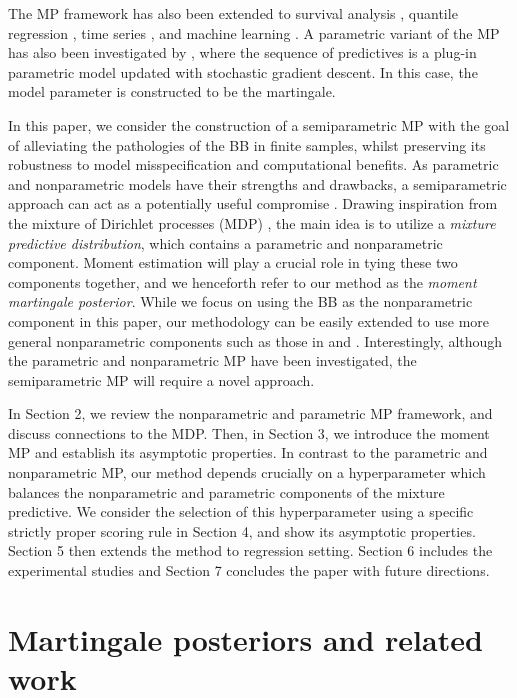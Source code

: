 \documentclass[11pt,a4paper]{article}
\theoremstyle{plain}
\theoremstyle{remark}
\theoremstyle{remark}
\begin{document}
 The MP framework has also been extended to survival analysis \citep{walker2024martingale}, quantile regression \citep{fong2024Bayesian}, time series \citep{Moya2024}, and machine learning \citep{lee2023martingale,falck2024large}.
 A parametric variant of the MP has also been investigated by \citep{holmes2023statistical,garelli2024asymptotics, fortini2025exchangeability}, where the sequence of predictives is a plug-in parametric model updated with stochastic gradient descent. In this case, the model parameter is constructed to be the martingale. 

In this paper, we consider the construction of a semiparametric MP with the goal of alleviating the pathologies of the BB in finite samples, whilst preserving its robustness to model misspecification and computational benefits. As parametric and nonparametric models have their strengths and drawbacks, a semiparametric approach can act as a potentially useful compromise \citep{powell1994estimation}. Drawing inspiration from the mixture of Dirichlet processes (MDP) \citep{Antoniak1974,Lyddon2018}, the main idea is to utilize a \textit{mixture predictive distribution}, which contains a parametric and nonparametric component.  Moment estimation will play a crucial role in tying these two components together, and we henceforth refer to our method as the \textit{moment martingale posterior}. 
 While we focus on using the BB as the nonparametric component in this paper, our methodology can be easily extended to use more general nonparametric components such as those in \cite{fortini2020quasi} and \cite{fong2023martingale}. 
Interestingly, although the parametric and nonparametric MP have been investigated, the semiparametric MP will require a novel approach.

 
 In Section 2, we review the nonparametric and parametric MP framework, and discuss connections to the MDP. Then, in Section 3, we introduce the moment MP and establish its asymptotic properties. In contrast to the parametric and nonparametric MP, our method depends crucially on a hyperparameter which balances the nonparametric and parametric components of the mixture predictive.  We consider the selection of this hyperparameter using a specific strictly proper scoring rule in Section 4, and show its asymptotic properties. Section 5 then extends the method to regression setting. Section 6 includes the experimental studies and Section 7 concludes the paper with future directions.


\section{Martingale posteriors and related work}
\end{document}

